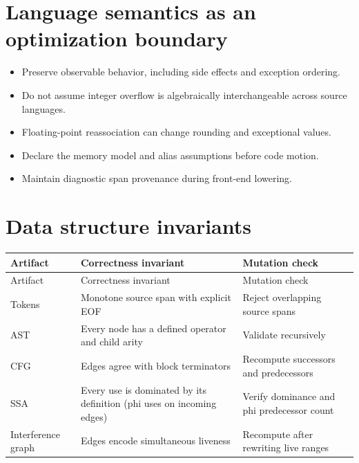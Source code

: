 \documentclass[10pt,letterpaper]{article}
\begin{document}
\section{Language semantics as an optimization boundary}
\begin{itemize}
\item Preserve observable behavior, including side effects and exception ordering.
\item Do not assume integer overflow is algebraically interchangeable across source languages.
\item Floating-point reassociation can change rounding and exceptional values.
\item Declare the memory model and alias assumptions before code motion.
\item Maintain diagnostic span provenance during front-end lowering.
\end{itemize}

\section{Data structure invariants}
\begin{longtable}{|>{\raggedright\arraybackslash}p{}|>{\raggedright\arraybackslash}p{}|>{\raggedright\arraybackslash}p{}|}
\hline
Artifact & Correctness invariant & Mutation check\\ \hline\endfirsthead
\hline
Artifact & Correctness invariant & Mutation check\\ \hline\endhead
Tokens & Monotone source span with explicit EOF & Reject overlapping source spans\\ \hline
AST & Every node has a defined operator and child arity & Validate recursively\\ \hline
CFG & Edges agree with block terminators & Recompute successors and predecessors\\ \hline
SSA & Every use is dominated by its definition (phi uses on incoming edges) & Verify dominance and phi predecessor count\\ \hline
Interference graph & Edges encode simultaneous liveness & Recompute after rewriting live ranges\\ \hline
\end{longtable}
\end{document}
